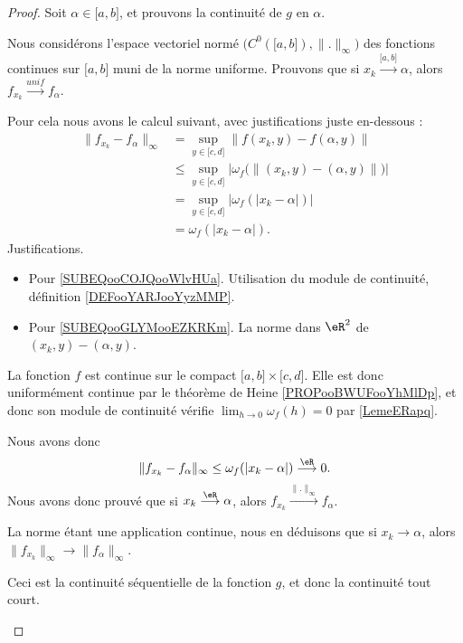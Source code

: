\begin{proof}
	Soit \( \alpha\in\mathopen[ a , b \mathclose]\), et prouvons la continuité de \( g\) en \( \alpha\).
	\begin{subproof}
		\spitem[Le décor]
		Nous considérons l'espace vectoriel normé \( \big( C^0(\mathopen[ a , b \mathclose]),\| . \|_{\infty} \big)\) des fonctions continues sur \( \mathopen[ a , b \mathclose]\) muni de la norme uniforme. Prouvons que si \( x_k\stackrel{\mathopen[ a , b \mathclose]}{\longrightarrow}\alpha\), alors \( f_{x_k}\stackrel{unif}{\longrightarrow}f_{\alpha}\).

		Pour cela nous avons le calcul suivant, avec justifications juste en-dessous :
		\begin{subequations}
			\begin{align}
				\| f_{x_k}-f_{\alpha} \|_{\infty} & =\sup_{y\in\mathopen[ c , d \mathclose]}\| f(x_k,y)-f(\alpha,y) \|                                                                 \\
				                                  & \leq\sup_{y\in\mathopen[ c , d \mathclose]}\big| \omega_f\big( \| (x_k,y)-(\alpha,y) \| \big) \big|    \label{SUBEQooCOJQooWlvHUa} \\
				                                  & =\sup_{y\in\mathopen[ c , d \mathclose]}| \omega_f(| x_k-\alpha |) |       \label{SUBEQooGLYMooEZKRKm}                             \\
				                                  & =\omega_f(| x_k-\alpha |).
			\end{align}
		\end{subequations}
		Justifications.
		\begin{itemize}
			\item Pour \eqref{SUBEQooCOJQooWlvHUa}. Utilisation du module de continuité, définition \ref{DEFooYARJooYyzMMP}.
			\item Pour \eqref{SUBEQooGLYMooEZKRKm}. La norme dans \( \eR^2\) de \( (x_k,y)-(\alpha,y)\).
		\end{itemize}
		La fonction \( f\) est continue sur le compact \( \mathopen[ a , b \mathclose]\times \mathopen[ c , d \mathclose]\). Elle est donc uniformément continue par le théorème de Heine \ref{PROPooBWUFooYhMlDp}, et donc son module de continuité vérifie \( \lim_{h\to 0} \omega_f(h)=0\) par \ref{LemeERapq}.

		Nous avons donc
		\begin{equation}
			\| f_{x_k}-f_{\alpha} \|_{\infty} \leq \omega_f(| x_k-\alpha |)\stackrel{\eR}{\longrightarrow}0.
		\end{equation}
		Nous avons donc prouvé que si \( x_k\stackrel{\eR}{\longrightarrow}\alpha\), alors \( f_{x_k}\stackrel{\| . \|_{\infty}}{\longrightarrow}f_{\alpha}\).

		\spitem[Conclusion]
		La norme étant une application continue, nous en déduisons que si \( x_k\to \alpha\), alors \( \| f_{x_k} \|_{\infty}\to \| f_{\alpha} \|_{\infty}\).

		Ceci est la continuité séquentielle de la fonction \( g\), et donc la continuité tout court.
	\end{subproof}
\end{proof}

